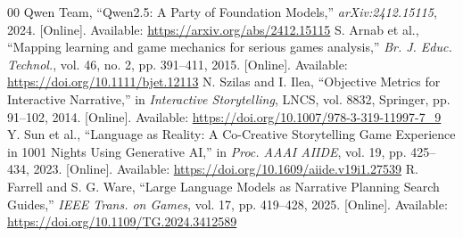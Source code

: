 \documentclass[conference]{IEEEtran}
\begin{document}
\begin{thebibliography}{00}
 Qwen Team, ``Qwen2.5: A Party of Foundation Models,'' \textit{arXiv:2412.15115}, 2024. [Online]. Available: \url{https://arxiv.org/abs/2412.15115}
 S. Arnab et al., ``Mapping learning and game mechanics for serious games analysis,'' \textit{Br. J. Educ. Technol.}, vol. 46, no. 2, pp. 391--411, 2015. [Online]. Available: \url{https://doi.org/10.1111/bjet.12113}
 N. Szilas and I. Ilea, ``Objective Metrics for Interactive Narrative,'' in \textit{Interactive Storytelling}, LNCS, vol. 8832, Springer, pp. 91--102, 2014. [Online]. Available: \url{https://doi.org/10.1007/978-3-319-11997-7_9}
 Y. Sun et al., ``Language as Reality: A Co-Creative Storytelling Game Experience in 1001 Nights Using Generative AI,'' in \textit{Proc. AAAI AIIDE}, vol. 19, pp. 425--434, 2023. [Online]. Available: \url{https://doi.org/10.1609/aiide.v19i1.27539}
 R. Farrell and S. G. Ware, ``Large Language Models as Narrative Planning Search Guides,'' \textit{IEEE Trans. on Games}, vol. 17, pp. 419--428, 2025. [Online]. Available: \url{https://doi.org/10.1109/TG.2024.3412589}
\end{thebibliography}
\end{document}
